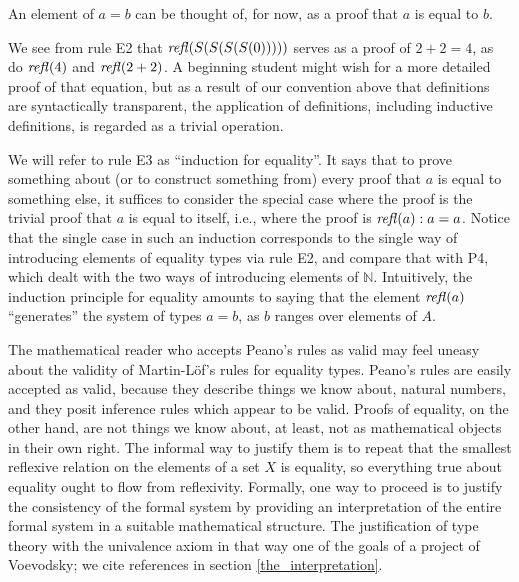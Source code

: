 \documentclass[letter,12pt]{amsart}
\theoremstyle{definition}
\theoremstyle{remark}
\numberwithin{equation}{section}
\newcommand{\refl}{\mathop{{\it refl}}}
\newcommand{\NN}{\mathbb{N}}
\begin{document}
\noindent An element of $a=b$ can be thought of, for now, as a proof that $a$ is equal to $b$.

We see from rule E2 that $\refl(S(S(S(S(0)))))$ serves as a proof of $2+2=4$, as do $\refl(4)$ and $\refl(2+2)$.  A beginning student might wish
for a more detailed proof of that equation, but as a result of our convention above that definitions are syntactically transparent, the
application of definitions, including inductive definitions, is regarded as a trivial operation.

We will refer to rule E3 as ``induction for equality''.  It says that to prove something about (or to construct something from) every proof that
$a$ is equal to something else, it suffices to consider the special case where the proof is the trivial proof that $a$ is equal to itself, i.e.,
where the proof is $\refl(a) : a=a$.  Notice that the single case in such an induction corresponds to the single way of introducing elements of
equality types via rule E2, and compare that with P4, which dealt with the two ways of introducing elements of $\NN$.
Intuitively, the induction principle for equality amounts to saying that the element $\refl(a)$ ``generates'' the system of types $a=b$, as $b$
ranges over elements of $A$.

The mathematical reader who accepts Peano's rules as valid may feel uneasy about the validity of Martin-L\"of's rules for equality types.
Peano's rules are easily accepted as valid, because they describe things we know about, natural numbers, and they posit inference rules which
appear to be valid.  Proofs of equality, on the other hand, are not things we know about, at least, not as mathematical objects in their own
right.  The informal way to justify them is to repeat that the smallest reflexive relation on the elements of a set $X$ is equality, so
everything true about equality ought to flow from reflexivity.  Formally, one way to proceed is to justify the consistency of the formal system
by providing an interpretation of the entire formal system in a suitable mathematical structure.  The justification of type theory with the
univalence axiom in that way one of the goals of a project of Voevodsky; we cite references in section \ref{the_interpretation}.
\end{document}
